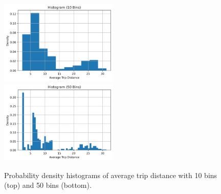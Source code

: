 \documentclass[11pt]{article}
\begin{document}
\begin{multicols}{2}
    \begin{figure}[H]
        \centering
        \includegraphics[width=0.5\textwidth]{../plots/histogram-Average Trip Distance-10-bins.png}
        \includegraphics[width=0.5\textwidth]{../plots/histogram-Average Trip Distance-50-bins.png}
        \caption{Probability density histograms of average trip distance with 10 bins (top) and 50 bins (bottom).} %
        \label{fig:hists}
    \end{figure}
\end{multicols}


\end{document}
